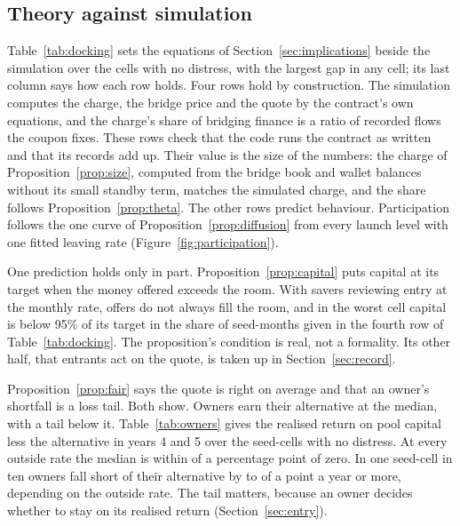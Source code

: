 \subsection{Theory against simulation}

Table~\ref{tab:docking} sets the equations of Section~\ref{sec:implications} beside the simulation over the cells
with no distress, with the largest gap in any cell; its last column says how each row holds. Four rows hold by
construction. The simulation computes the charge, the bridge price and the quote by the contract's own equations,
and the charge's share of bridging finance is a ratio of recorded flows the coupon fixes. These rows check
that the code runs the contract as written and that its records add up. Their value is the size of the
numbers: the charge of Proposition~\ref{prop:size}, computed from the bridge book and wallet balances without its
small standby term, matches the simulated charge, and the share follows Proposition~\ref{prop:theta}. The other
rows predict behaviour. Participation follows the one curve of Proposition~\ref{prop:diffusion}
from every launch level with one fitted leaving rate (Figure~\ref{fig:participation}).

One prediction holds only in part. Proposition~\ref{prop:capital} puts capital at its target when the money offered
exceeds the room. With savers reviewing entry at the monthly rate, offers do not always fill the room, and in the
worst cell capital is below 95\% of its target in the share of seed-months given in the fourth row of
Table~\ref{tab:docking}. The proposition's condition is real, not a formality. Its other half, that
entrants act on the quote, is taken up in Section~\ref{sec:record}.

Proposition~\ref{prop:fair} says the quote is right on average and that an owner's shortfall is a loss tail. Both show.
Owners earn their alternative at the median, with a tail below it. Table~\ref{tab:owners} gives the realised
return on pool capital less the alternative in years 4 and 5 over the seed-cells with no distress. At every
outside rate the median is within \OwnersMedianWorst{} of a percentage point of zero. In one seed-cell in ten
owners fall short of their alternative by \OwnersTenthLeast{} to \OwnersTenthWorst{} of a point a year or more,
depending on the outside rate. The tail matters, because an owner decides whether to stay on its realised
return (Section~\ref{sec:entry}).

\begin{table}[htbp]\centering\small
\resizebox{\linewidth}{!}{}
\caption{Theory against simulation over CPM's cells with no distress: each quantity's formula value and the
simulated value, as ranges over cells, and the largest gap in any cell. A row holds by construction where the
simulation computes the quantity by that equation, as predicted where the equation describes behaviour, and in
part where the prediction's condition is not always met.}
\label{tab:docking}
\end{table}

